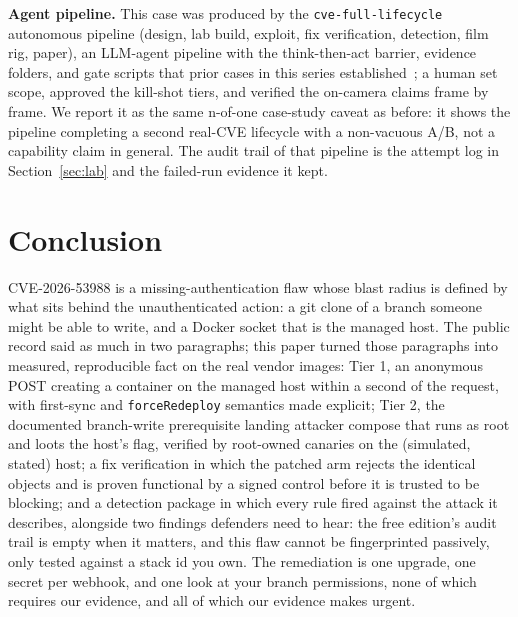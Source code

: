 \documentclass[journal]{IEEEtran}
\begin{document}
\textbf{Agent pipeline.} This case was produced by the
\texttt{cve-full-lifecycle} autonomous pipeline (design, lab build, exploit,
fix verification, detection, film rig, paper), an LLM-agent pipeline with the
think-then-act barrier, evidence folders, and gate scripts that prior cases in
this series established~\cite{zimbraPaper}; a human set scope, approved the
kill-shot tiers, and verified the on-camera claims frame by frame. We report
it as the same n-of-one case-study caveat as before: it shows the pipeline
completing a second real-CVE lifecycle with a non-vacuous A/B, not a
capability claim in general. The audit trail of that pipeline is the attempt log in Section~\ref{sec:lab} and the failed-run evidence it kept.

\section{Conclusion}
\label{sec:conclusion}

CVE-2026-53988 is a missing-authentication flaw whose blast radius is defined
by what sits behind the unauthenticated action: a git clone of a branch
someone might be able to write, and a Docker socket that is the managed host.
The public record said as much in two paragraphs; this paper turned those
paragraphs into measured, reproducible fact on the real vendor images: Tier 1,
an anonymous POST creating a container on the managed host within a second of
the request, with first-sync and \texttt{forceRedeploy} semantics made
explicit; Tier 2, the documented branch-write prerequisite landing attacker
compose that runs as root and loots the host's flag, verified by root-owned
canaries on the (simulated, stated) host; a fix verification in which the
patched arm rejects the identical objects and is proven functional by a signed
control before it is trusted to be blocking; and a detection package in which
every rule fired against the attack it describes, alongside two findings
defenders need to hear: the free edition's audit trail is empty when it
matters, and this flaw cannot be fingerprinted passively, only tested against a stack id you own. The remediation is one upgrade, one secret per webhook, and one
look at your branch permissions, none of which requires our evidence, and all
of which our evidence makes urgent.
\end{document}
